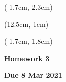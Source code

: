 \documentclass[12pt, oneside]{article}
\begin{document}
\begin{textblock*}{4cm}(-1.7cm,-2.3cm)
\end{textblock*}

\begin{textblock*}{8cm}(12.5cm,-1cm)
\end{textblock*}
\begin{textblock*}{13.5cm}(-1.7cm,-1.8cm)
\end{textblock*}

\vspace{1cm}

\begin{center}
\textbf{\Large Homework 3}

\textbf{Due 8 Mar 2021}
\end{center}
\end{document}
